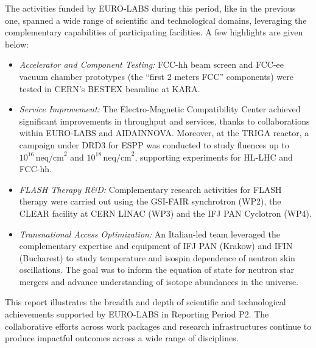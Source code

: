 The activities funded by EURO-LABS during this period, like in the previous one, spanned a wide range of scientific and technological domains, leveraging the complementary capabilities of participating facilities. A few highlights are given below: 



\begin{itemize}
    \item {\it Accelerator and Component Testing:} FCC-hh beam screen and FCC-ee vacuum chamber prototypes (the ``first 2 meters FCC'' components) were tested in CERN's BESTEX beamline at KARA.
    
    \item {\it Service Improvement:} The Electro-Magnetic Compatibility Center achieved significant improvements in throughput and services, thanks to collaborations within EURO-LABS and AIDAINNOVA. Moreover, at the TRIGA reactor, a campaign under DRD3 for ESPP  was conducted to study fluences up to \(10^{16} \, \text{neq/cm}^2\) and \(10^{18} \, \text{neq/cm}^2\), supporting experiments for HL-LHC and FCC-hh.
    
    \item {\it FLASH Therapy R\&D:} Complementary research activities for FLASH therapy were carried out using
        the GSI-FAIR synchrotron (WP2),
        the CLEAR facility at CERN LINAC (WP3)
        and the IFJ PAN Cyclotron (WP4).
    
    \item {\it Transnational Access Optimization:} An Italian-led team leveraged the complementary expertise and equipment of IFJ PAN (Krakow) and IFIN (Bucharest) to study temperature and isospin dependence of neutron skin oscillations. The goal was to inform the equation of state for neutron star mergers and advance understanding of isotope abundances in the universe.
\end{itemize}



This report illustrates the breadth and depth of scientific and technological achievements supported by EURO-LABS in Reporting Period P2. The collaborative efforts across work packages and research infrastructures continue to produce impactful outcomes across a wide range of disciplines.



